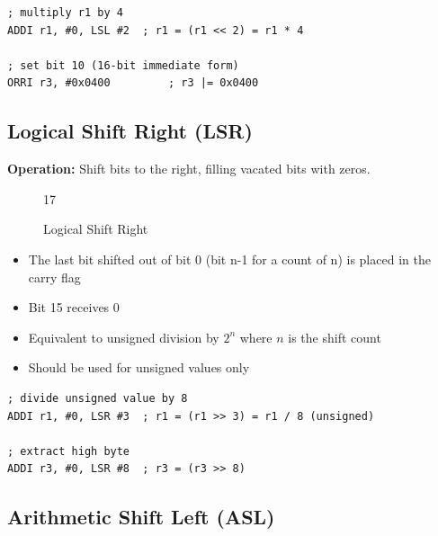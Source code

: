 \begin{example}
	\begin{lstlisting}
; multiply r1 by 4
ADDI r1, #0, LSL #2  ; r1 = (r1 << 2) = r1 * 4

; set bit 10 (16-bit immediate form)
ORRI r3, #0x0400         ; r3 |= 0x0400
	\end{lstlisting}
	\caption{Constant Multiply and Bit Set (LSL)}
\end{example}

\subsection{Logical Shift Right (LSR)}

\textbf{Operation:} Shift bits to the right, filling vacated bits with zeros.

\begin{figure}[H]
	\centering
	\begin{bytefield}[bitwidth=1.2em]{17}
		 \\
	\end{bytefield}
	\caption{Logical Shift Right}
\end{figure}

\begin{itemize}
	\item The last bit shifted out of bit 0 (bit n-1 for a count of n) is placed in the carry flag
	\item Bit 15 receives 0
	\item Equivalent to unsigned division by $2^n$ where $n$ is the shift count
	\item Should be used for unsigned values only
\end{itemize}

\begin{example}
	\begin{lstlisting}
; divide unsigned value by 8
ADDI r1, #0, LSR #3  ; r1 = (r1 >> 3) = r1 / 8 (unsigned)

; extract high byte
ADDI r3, #0, LSR #8  ; r3 = (r3 >> 8)
	\end{lstlisting}
	\caption{Unsigned Divide and Byte Extraction (LSR)}
\end{example}

\subsection{Arithmetic Shift Left (ASL)}

